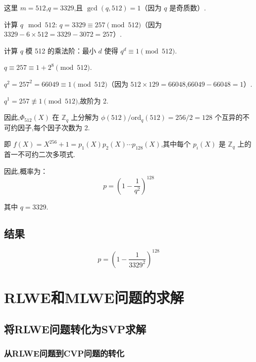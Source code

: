 \documentclass[12pt,a4paper]{article}
\numberwithin{equation}{section}
\begin{document}
这里 $m = 512$,$q = 3329$,且 $\gcd(q, 512) = 1$（因为 $q$ 是奇质数）.

计算 $q \mod 512$: $q = 3329 \equiv 257 \pmod{512}$（因为 $3329 - 6 \times 512 = 3329 - 3072 = 257$）.

计算 $q$ 模 512 的乘法阶：最小 $d$ 使得 $q^d \equiv 1 \pmod{512}$.

$q \equiv 257 \equiv 1 + 2^8 \pmod{512}$.

$q^2 = 257^2 = 66049 \equiv 1 \pmod{512}$（因为 $512 \times 129 = 66048$,$66049 - 66048 = 1$）.

$q^1 = 257 \not\equiv 1 \pmod{512}$,故阶为 2.

因此,$\Phi_{512}(X)$ 在 $\mathbb{Z}_q$ 上分解为 $\phi(512) / \text{ord}_q(512) = 256 / 2 = 128$ 个互异的不可约因子,每个因子次数为 2.

即 $f(X) = X^{256} + 1 = p_1(X) p_2(X) \cdots p_{128}(X)$,其中每个 $p_i(X)$ 是 $\mathbb{Z}_q$ 上的首一不可约二次多项式.

因此,概率为：
\begin{equation}
	p = \left(1 - \frac{1}{q^2}\right)^{128}
\end{equation}


其中 $q = 3329$.



\subsection{结果}

\begin{equation}
	p = \left(1 - \frac{1}{3329^2}\right)^{128}
\end{equation}



\section{RLWE和MLWE问题的求解}

\subsection{将RLWE问题转化为SVP求解}

\subsubsection{从RLWE问题到CVP问题的转化}
\end{document}

